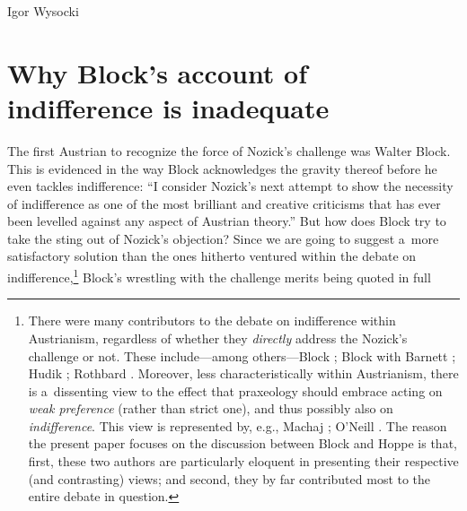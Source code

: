 \begin{artengenv}{Igor Wysocki}
\section{Why Block's account of indifference is inadequate }
The first Austrian to recognize the force of Nozick's challenge was Walter Block. This is evidenced in the way Block
\parencite*[][p.423]{block_robert_1980} %
 acknowledges the gravity thereof before he even tackles indifference: ``I consider Nozick's next attempt to show the necessity of indifference as one of the most brilliant and creative criticisms that has ever been levelled against any aspect of Austrian theory.'' But how does Block try to take the sting out of Nozick's objection? Since we are going to suggest a~more satisfactory solution than the ones hitherto ventured within the debate on indifference,\footnote{There were many contributors to the debate on indifference within Austrianism, regardless of whether they \textit{directly} address the Nozick's challenge or not. These include---among others---Block 
\parencites*[][]{block_rejoinder_2009}[][]{block_rejoinder_2009-1}; %
 Block with Barnett 
\parencite*[][]{block_rejoinder_2010}; %
 Hudik 
\parencite*[][]{hudik_note_2011}; %
 Rothbard 
\parencite[][]{rothbard_toward_2011}. %
 Moreover, less characteristically within Austrianism, there is a~dissenting view to the effect that praxeology should embrace acting on \textit{weak preference} (rather than strict one), and thus possibly also on \textit{indifference}. This view is represented by, e.g., Machaj 
\parencite*[][]{machaj_praxeological_2007}; %
 O'Neill 
\parencite*[][]{oneill_choice_2010}. %
 The reason the present paper focuses on the discussion between Block and Hoppe is that, first, these two authors are particularly eloquent in presenting their respective (and contrasting) views; and second, they by far contributed most to the entire debate in question.} Block's 
\parencite*[][pp.423–424]{block_robert_1980} %
 wrestling with the challenge merits being quoted in full


\end{artengenv}
